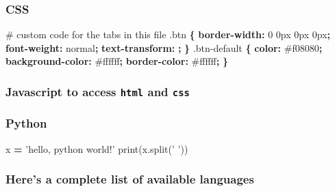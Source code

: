 \documentclass[article]{article}
\newenvironment{Shaded}{\begin{snugshade}}{\end{snugshade}}
\newcommand{\KeywordTok}[1]{\textcolor[rgb]{0.13,0.29,0.53}{\textbf{#1}}}
\newcommand{\DataTypeTok}[1]{\textcolor[rgb]{0.13,0.29,0.53}{#1}}
\newcommand{\FloatTok}[1]{\textcolor[rgb]{0.00,0.00,0.81}{#1}}
\newcommand{\StringTok}[1]{\textcolor[rgb]{0.31,0.60,0.02}{#1}}
\newcommand{\OperatorTok}[1]{\textcolor[rgb]{0.81,0.36,0.00}{\textbf{#1}}}
\newcommand{\BuiltInTok}[1]{#1}
\newcommand{\AttributeTok}[1]{\textcolor[rgb]{0.77,0.63,0.00}{#1}}
\newcommand{\NormalTok}[1]{#1}
\begin{document}
\subsubsection{CSS}\label{css}

\begin{Shaded}
\begin{Highlighting}[]
\NormalTok{# custom code for the tabs in this file}
\FloatTok{.btn} \KeywordTok{\{}
    \KeywordTok{border-width:} \DataTypeTok{0} \DataTypeTok{0px} \DataTypeTok{0px} \DataTypeTok{0px}\KeywordTok{;}
    \KeywordTok{font-weight:} \DataTypeTok{normal}\KeywordTok{;}
    \KeywordTok{text-transform:} \KeywordTok{;}
\KeywordTok{\}}
\FloatTok{.btn-default} \KeywordTok{\{}
    \KeywordTok{color:} \DataTypeTok{#f08080}\KeywordTok{;}
    \KeywordTok{background-color:} \DataTypeTok{#ffffff}\KeywordTok{;}
    \KeywordTok{border-color:} \DataTypeTok{#ffffff}\KeywordTok{;}
\KeywordTok{\}}
\end{Highlighting}
\end{Shaded}

\subsubsection{\texorpdfstring{Javascript to access \texttt{html} and
\texttt{css}}{Javascript to access html and css}}\label{javascript-to-access-html-and-css}

\begin{Shaded}
\end{Shaded}

\subsubsection{Python}\label{python}

\begin{Shaded}
\begin{Highlighting}[]
\NormalTok{x }\OperatorTok{=} \StringTok{'hello, python world!'}
\BuiltInTok{print}\NormalTok{(x.split(}\StringTok{' '}\NormalTok{))}
\end{Highlighting}
\end{Shaded}

\subsubsection{Here's a complete list of available
languages}\label{heres-a-complete-list-of-available-languages}
\end{document}
